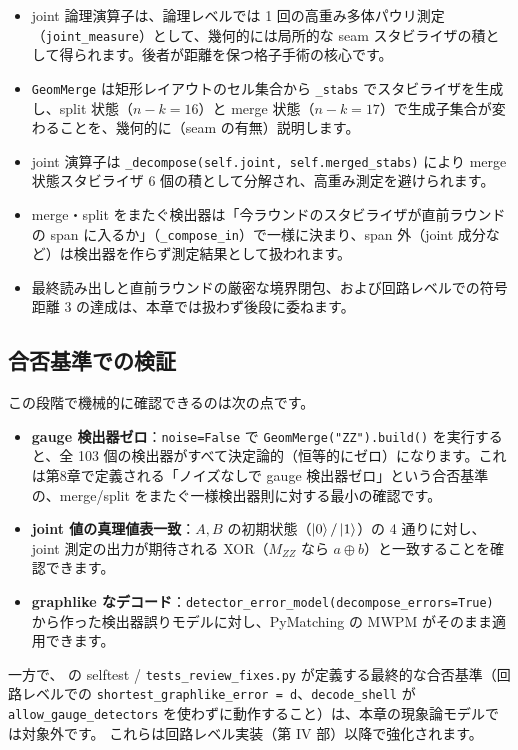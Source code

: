 \begin{itemize}
  \item joint 論理演算子は、論理レベルでは 1 回の高重み多体パウリ測定（\texttt{joint\_measure}）として、幾何的には局所的な seam スタビライザの積として得られます。後者が距離を保つ格子手術の核心です。
  \item \texttt{GeomMerge} は矩形レイアウトのセル集合から \texttt{\_stabs} でスタビライザを生成し、split 状態（$n-k=16$）と merge 状態（$n-k=17$）で生成子集合が変わることを、幾何的に（seam の有無）説明します。
  \item joint 演算子は \texttt{\_decompose(self.joint, self.merged\_stabs)} により merge 状態スタビライザ 6 個の積として分解され、高重み測定を避けられます。
  \item merge・split をまたぐ検出器は「今ラウンドのスタビライザが直前ラウンドの span に入るか」（\texttt{\_compose\_in}）で一様に決まり、span 外（joint 成分など）は検出器を作らず測定結果として扱われます。
  \item 最終読み出しと直前ラウンドの厳密な境界閉包、および回路レベルでの符号距離 3 の達成は、本章では扱わず後段に委ねます。
\end{itemize}

\subsection*{合否基準での検証}

この段階で機械的に確認できるのは次の点です。

\begin{itemize}
  \item \textbf{gauge 検出器ゼロ}：\texttt{noise=False} で \texttt{GeomMerge("ZZ").build()} を実行すると、全 103 個の検出器がすべて決定論的（恒等的にゼロ）になります。これは第8章で定義される「ノイズなしで gauge 検出器ゼロ」という合否基準の、merge/split をまたぐ一様検出器則に対する最小の確認です。
  \item \textbf{joint 値の真理値表一致}：$A,B$ の初期状態（$\ket0/\ket1$）の 4 通りに対し、joint 測定の出力が期待される XOR（$M_{ZZ}$ なら $a\oplus b$）と一致することを確認できます。
  \item \textbf{graphlike なデコード}：\texttt{detector\_error\_model(decompose\_errors=True)} から作った検出器誤りモデルに対し、PyMatching の MWPM がそのまま適用できます。
\end{itemize}

一方で、 の selftest / \texttt{tests\_review\_fixes.py} が定義する最終的な合否基準（回路レベルでの \texttt{shortest\_graphlike\_error = d}、\texttt{decode\_shell} が \texttt{allow\_gauge\_detectors} を使わずに動作すること）は、本章の現象論モデルでは対象外です。
これらは回路レベル実装（第 IV 部）以降で強化されます。

